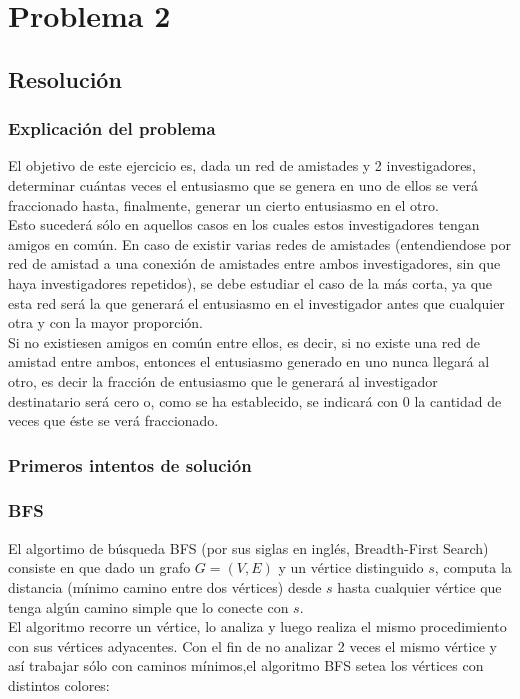 \section{Problema 2}

\subsection{Resolución}

\subsubsection{Explicación del problema}
\indent El objetivo de este ejercicio es, dada un red de amistades y 2
investigadores, determinar cuántas veces el entusiasmo que se genera en uno de
ellos se verá fraccionado hasta, finalmente, generar un cierto entusiasmo en el
otro. \\
\indent Esto sucederá sólo en aquellos casos en los cuales estos investigadores
tengan amigos en común. En caso de existir varias redes de amistades
(entendiendose por red de amistad a una conexión de amistades entre ambos
investigadores, sin que haya investigadores repetidos), se debe estudiar el caso
de la más corta, ya que esta red será la que generará el entusiasmo en el
investigador antes que cualquier otra y con la mayor proporción. \\
\indent Si no existiesen amigos en común entre ellos, es decir, si no existe una
red de amistad entre ambos, entonces el entusiasmo generado en uno nunca llegará
al otro, es decir la fracción de entusiasmo que le generará al investigador
destinatario será cero o, como se ha establecido, se indicará con $0$ la
cantidad de veces que éste se verá fraccionado. \\

\subsubsection{Primeros intentos de solución}

\subsubsection{BFS}
El algortimo de búsqueda BFS (por sus siglas en inglés, Breadth-First Search)
consiste en que dado un grafo $G= (V,E)$ y un vértice distinguido $s$, computa
la distancia (mínimo camino entre dos vértices) desde $s$ hasta cualquier
vértice que tenga algún camino simple que lo conecte con $s$.\\
\indent El algoritmo recorre un vértice, lo analiza y luego realiza el mismo
procedimiento con sus vértices adyacentes. Con el fin de no analizar 2 veces el
mismo vértice y así trabajar sólo con caminos mínimos,el algoritmo BFS setea los
vértices con distintos colores:

